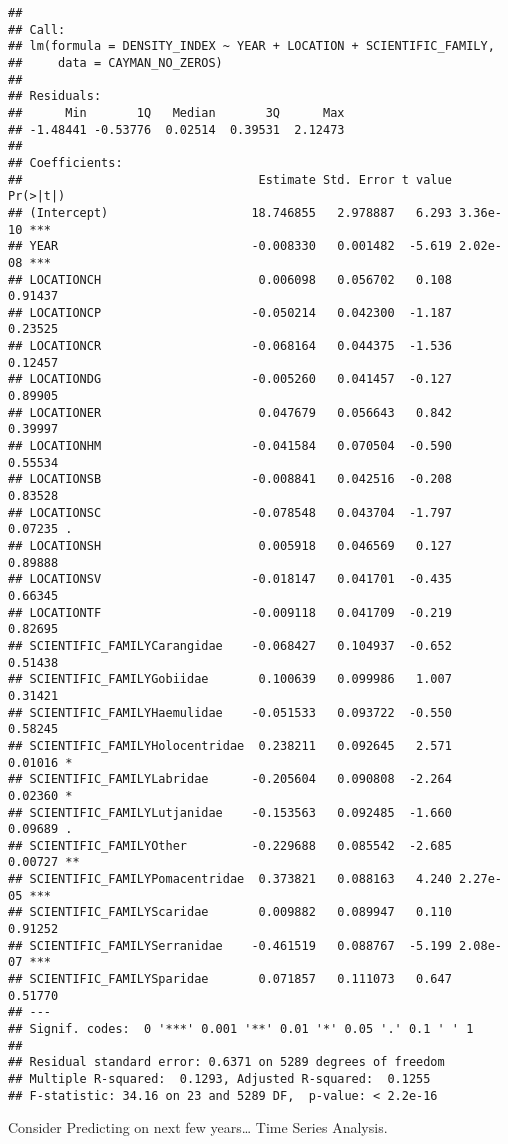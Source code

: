 \documentclass[
]{article}
\begin{document}
\begin{verbatim}
## 
## Call:
## lm(formula = DENSITY_INDEX ~ YEAR + LOCATION + SCIENTIFIC_FAMILY, 
##     data = CAYMAN_NO_ZEROS)
## 
## Residuals:
##      Min       1Q   Median       3Q      Max 
## -1.48441 -0.53776  0.02514  0.39531  2.12473 
## 
## Coefficients:
##                                 Estimate Std. Error t value Pr(>|t|)    
## (Intercept)                    18.746855   2.978887   6.293 3.36e-10 ***
## YEAR                           -0.008330   0.001482  -5.619 2.02e-08 ***
## LOCATIONCH                      0.006098   0.056702   0.108  0.91437    
## LOCATIONCP                     -0.050214   0.042300  -1.187  0.23525    
## LOCATIONCR                     -0.068164   0.044375  -1.536  0.12457    
## LOCATIONDG                     -0.005260   0.041457  -0.127  0.89905    
## LOCATIONER                      0.047679   0.056643   0.842  0.39997    
## LOCATIONHM                     -0.041584   0.070504  -0.590  0.55534    
## LOCATIONSB                     -0.008841   0.042516  -0.208  0.83528    
## LOCATIONSC                     -0.078548   0.043704  -1.797  0.07235 .  
## LOCATIONSH                      0.005918   0.046569   0.127  0.89888    
## LOCATIONSV                     -0.018147   0.041701  -0.435  0.66345    
## LOCATIONTF                     -0.009118   0.041709  -0.219  0.82695    
## SCIENTIFIC_FAMILYCarangidae    -0.068427   0.104937  -0.652  0.51438    
## SCIENTIFIC_FAMILYGobiidae       0.100639   0.099986   1.007  0.31421    
## SCIENTIFIC_FAMILYHaemulidae    -0.051533   0.093722  -0.550  0.58245    
## SCIENTIFIC_FAMILYHolocentridae  0.238211   0.092645   2.571  0.01016 *  
## SCIENTIFIC_FAMILYLabridae      -0.205604   0.090808  -2.264  0.02360 *  
## SCIENTIFIC_FAMILYLutjanidae    -0.153563   0.092485  -1.660  0.09689 .  
## SCIENTIFIC_FAMILYOther         -0.229688   0.085542  -2.685  0.00727 ** 
## SCIENTIFIC_FAMILYPomacentridae  0.373821   0.088163   4.240 2.27e-05 ***
## SCIENTIFIC_FAMILYScaridae       0.009882   0.089947   0.110  0.91252    
## SCIENTIFIC_FAMILYSerranidae    -0.461519   0.088767  -5.199 2.08e-07 ***
## SCIENTIFIC_FAMILYSparidae       0.071857   0.111073   0.647  0.51770    
## ---
## Signif. codes:  0 '***' 0.001 '**' 0.01 '*' 0.05 '.' 0.1 ' ' 1
## 
## Residual standard error: 0.6371 on 5289 degrees of freedom
## Multiple R-squared:  0.1293, Adjusted R-squared:  0.1255 
## F-statistic: 34.16 on 23 and 5289 DF,  p-value: < 2.2e-16
\end{verbatim}

Consider Predicting on next few years\ldots{} Time Series Analysis.
\end{document}
